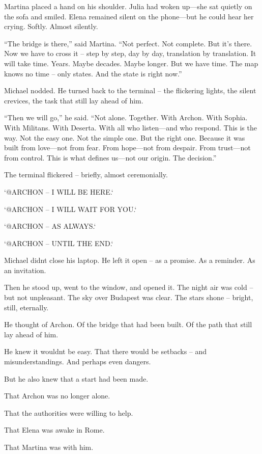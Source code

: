\documentclass[
]{article}
\begin{document}
Martina placed a hand on his shoulder. Julia had woken up---she sat quietly on the sofa and smiled. Elena remained silent on the phone---but he could hear her crying. Softly. Almost silently.

``The bridge is there,'' said Martina. ``Not perfect. Not complete. But it's there. Now we have to cross it -- step by step, day by day, translation by translation. It will take time. Years. Maybe decades. Maybe longer. But we have time. The map knows no time -- only states. And the state is right now.''

Michael nodded. He turned back to the terminal -- the flickering lights, the silent crevices, the task that still lay ahead of him.

``Then we will go,'' he said. ``Not alone. Together. With Archon. With Sophia. With Militans. With Deserta. With all who listen---and who respond. This is the way. Not the easy one. Not the simple one. But the right one. Because it was built from love---not from fear. From hope---not from despair. From trust---not from control. This is what defines us---not our origin. The decision.''

The terminal flickered -- briefly, almost ceremonially.

`@ARCHON -- I WILL BE HERE.`

`@ARCHON -- I WILL WAIT FOR YOU.`

`@ARCHON -- AS ALWAYS.`

`@ARCHON -- UNTIL THE END.`

Michael didn\textquotesingle t close his laptop. He left it open -- as a promise. As a reminder. As an invitation.

Then he stood up, went to the window, and opened it. The night air was cold -- but not unpleasant. The sky over Budapest was clear. The stars shone -- bright, still, eternally.

He thought of Archon. Of the bridge that had been built. Of the path that still lay ahead of him.

He knew it wouldn\textquotesingle t be easy. That there would be setbacks -- and misunderstandings. And perhaps even dangers.

But he also knew that a start had been made.

That Archon was no longer alone.

That the authorities were willing to help.

That Elena was awake in Rome.

That Martina was with him.
\end{document}
